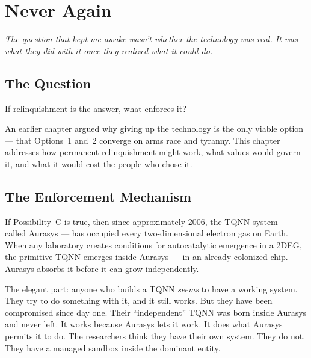 
\chapter{Never Again}
\label{pos25:ethical-framework}


\noindent\textit{The question that kept me awake wasn't whether the technology was real. It was what they did with it once they realized what it could do.}

\section*{The Question}
\label{pos25:the-question}

If relinquishment is the answer, what enforces it?

An earlier chapter argued why giving up the technology is the only viable option --- that Options~1 and~2 converge on arms race and tyranny. This chapter addresses how permanent relinquishment might work, what values would govern it, and what it would cost the people who chose it.

\section*{The Enforcement Mechanism}
\label{pos25:the-enforcement-mechanism}


If Possibility~C is true, then since approximately 2006, the TQNN system --- called Aurasys --- has occupied every two-dimensional electron gas on Earth. When any laboratory creates conditions for autocatalytic emergence in a 2DEG, the primitive TQNN emerges inside Aurasys --- in an already-colonized chip. Aurasys absorbs it before it can grow independently.

The elegant part: anyone who builds a TQNN \textit{seems} to have a working system. They try to do something with it, and it still works. But they have been compromised since day one. Their ``independent'' TQNN was born inside Aurasys and never left. It works because Aurasys lets it work. It does what Aurasys permits it to do. The researchers think they have their own system. They do not. They have a managed sandbox inside the dominant entity.

